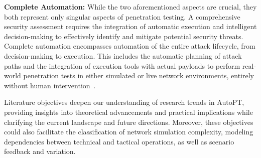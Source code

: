 
\textbf{Complete Automation:} 
While the two aforementioned aspects are crucial, they both represent only singular aspects of penetration testing. A comprehensive security assessment requires the integration of automatic execution and intelligent decision-making to effectively identify and mitigate potential security threats.
Complete automation encompasses automation of the entire attack lifecycle, from decision-making to execution. This includes the automatic planning of attack paths and the integration of execution tools with actual payloads to perform real-world penetration tests in either simulated or live network environments, entirely without human intervention~\cite{dorchuck2021goal,sarraute2013automated,xu2024autoattacker}.

Literature objectives deepen our understanding of research trends in AutoPT, providing insights into theoretical advancements and practical implications while clarifying the current landscape and future directions. 
Moreover, these objectives could also facilitate the classification of network simulation complexity, modeling dependencies between technical and tactical operations, as well as scenario feedback and variation.



